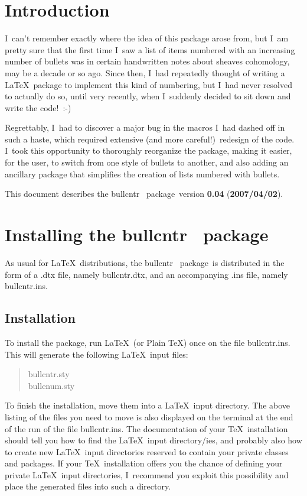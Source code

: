 \documentclass[a4paper]{article}
\newcommand*{\bullvers}{0.04}
\newcommand*{\bulldate}{2007/04/02}
\DeclareRobustCommand*{\packlass}[1]{%
	{\texorpdfstring{\normalfont \sffamily}{}#1}%
}
\DeclareRobustCommand*{\filedir}[1]{{\normalfont\ttfamily #1}}
\newcommand*{\Bullcntr}{bullcntr}
\newcommand*{\bull}{\packlass{\Bullcntr}}
\newcommand*{\tbull}{the \bull\ package}
\newcommand*{\Bullenum}{bullenum}
\begin{document}
\endgroup



\clearpage
\setcounter{secnumdepth}{0}

\section{Introduction}
\label{S:Intro}

I~can't remember exactly where the idea of this package arose from,
but I~am pretty sure that the first time I~saw a list of items
numbered with an increasing number of bullets was in certain
handwritten notes about sheaves cohomology, may be a decade or so ago.
Since then, I~had repeatedly thought of writing a \LaTeX\ package to
implement this kind of numbering, but I~had never resolved to actually
do so, until very recently, when I~suddenly decided to sit down and
write the code!~:-)

Regrettably, I~had to discover a major bug in the macros I~had dashed
off in such a haste, which required extensive (and more careful!)\
redesign of the code.  I~took this opportunity to thoroughly
reorganize the package, making it easier, for the user, to switch from
one style of bullets to another, and also adding an ancillary package
that simplifies the creation of lists numbered with bullets.

This document describes \tbull\ version \textbf{\bullvers}
(\textbf{\bulldate}).



\setcounter{secnumdepth}{3}

\section{Installing \tbull}

As usual for \LaTeX\ distributions, \tbull\ is distributed in the form
of a \filedir{.dtx} file, namely \filedir{\Bullcntr.dtx}, and an
accompanying \filedir{.ins} file, namely \filedir{\Bullcntr.ins}.



\subsection{Installation}

To install the package, run \LaTeX\ (or Plain \TeX) once on the file
\filedir{\Bullcntr.ins}.  This will generate the following \LaTeX\
input files:
%
\begin{quote}
	\ttfamily
	\Bullcntr.sty\\
	\Bullenum.sty
\end{quote}
%
To finish the installation, move them into a \LaTeX\ input directory.
The above listing of the files you need to move is also displayed on
the terminal at the end of the run of the file
\filedir{\Bullcntr.ins}.  The documentation of your \TeX\ installation
should tell you how to find the \LaTeX\ input directory/ies, and
probably also how to create new \LaTeX\ input directories reserved to
contain your private classes and packages.  If your \TeX\ installation
offers you the chance of defining your private \LaTeX\ input
directories, I~recommend you exploit this possibility and place the
generated files into such a directory.
\end{document}
